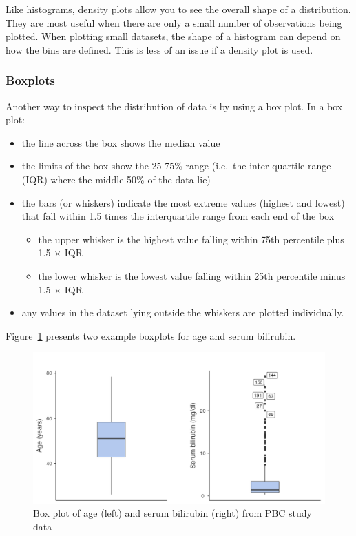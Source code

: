 \documentclass[
  a4paper,
]{memoir}
\providecommand{\tightlist}{%
  \setlength{\itemsep}{0pt}\setlength{\parskip}{0pt}}\usepackage{longtable,booktabs,array}
\begin{document}
Like histograms, density plots allow you to see the overall shape of a
distribution. They are most useful when there are only a small number of
observations being plotted. When plotting small datasets, the shape of a
histogram can depend on how the bins are defined. This is less of an
issue if a density plot is used.

\hypertarget{boxplots}{%
\subsubsection{Boxplots}\label{boxplots}}

Another way to inspect the distribution of data is by using a box plot.
In a box plot:

\begin{itemize}
\tightlist
\item
  the line across the box shows the median value
\item
  the limits of the box show the 25-75\% range (i.e.~the inter-quartile
  range (IQR) where the middle 50\% of the data lie)
\item
  the bars (or whiskers) indicate the most extreme values (highest and
  lowest) that fall within 1.5 times the interquartile range from each
  end of the box

  \begin{itemize}
  \tightlist
  \item
    the upper whisker is the highest value falling within 75th
    percentile plus 1.5 × IQR
  \item
    the lower whisker is the lowest value falling within 25th percentile
    minus 1.5 × IQR
  \end{itemize}
\item
  any values in the dataset lying outside the whiskers are plotted
  individually.
\end{itemize}

Figure~\ref{fig-box-1} presents two example boxplots for age and serum
bilirubin.

\begin{figure}

{\centering \includegraphics[width=1\textwidth,height=\textheight]{img/mod01/boxp-symmetric-skewed.png}

}

\caption{\label{fig-box-1}Box plot of age (left) and serum bilirubin
(right) from PBC study data}

\end{figure}
\end{document}
